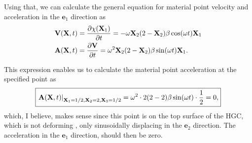 Using that, we can calculate the general equation for material point velocity and acceleration in the $\bm{e}_1$ direction as
\begin{align*}
    &\mathbf{V}(\mathbf{X}, t) = \frac{\partial \chi (\mathbf{X}_1)}{\partial t} = -\omega \mathbf{X}_2 (2- \mathbf{X}_2) \beta \cos (\omega t) \mathbf{X}_1\\
    &\mathbf{A}(\mathbf{X}, t) = \frac{\partial \mathbf{V}}{\partial t} = \omega^2 \mathbf{X}_2 (2 - \mathbf{X}_2) \beta \sin (\omega t) \mathbf{X}_1.
\end{align*}

This expression enables us to calculate the material point acceleration at the specified point as
\begin{equation*}
    \boxed{\left. \mathbf{A}(\mathbf{X}, t) \right\rvert_{\mathbf{X}_1 = 1/2, \mathbf{X}_2 = 2, \mathbf{X}_3 = 1/2} = \omega^2 \cdot 2 (2 - 2) \beta \sin (\omega t) \cdot \frac{1}{2} = 0,}
\end{equation*}
which, I believe, makes sense since this point is on the top surface of the HGC, which is not deforming , only sinusoidally displacing in the $\bm{e}_2$ direction. The acceleration in the $\bm{e}_1$ direction, should then be zero.


